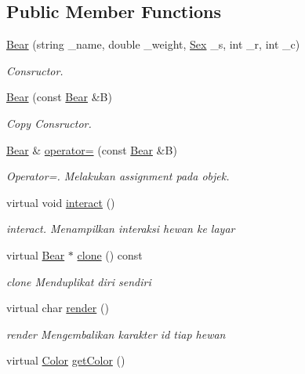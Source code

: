 \subsection*{Public Member Functions}
\begin{DoxyCompactItemize}
\item 
\hyperlink{classBear_a3afafc9aa9b3dd250f6655bf9a0246f6}{Bear} (string \+\_\+name, double \+\_\+weight, \hyperlink{sex_8h_a2633cb393c68bb2ee8080db58fb7ba93}{Sex} \+\_\+s, int \+\_\+r, int \+\_\+c)
\begin{DoxyCompactList}\small\item\em Consructor. \end{DoxyCompactList}\item 
\hyperlink{classBear_a496183e4a4191809bf67634e18c83499}{Bear} (const \hyperlink{classBear}{Bear} \&B)
\begin{DoxyCompactList}\small\item\em Copy Consructor. \end{DoxyCompactList}\item 
\hyperlink{classBear}{Bear} \& \hyperlink{classBear_a6ce0207456c0c4dc02f3dced1b447405}{operator=} (const \hyperlink{classBear}{Bear} \&B)
\begin{DoxyCompactList}\small\item\em Operator=. Melakukan assignment pada objek. \end{DoxyCompactList}\item 
virtual void \hyperlink{classBear_af149829fb71fdedae09885a66964d216}{interact} ()
\begin{DoxyCompactList}\small\item\em interact. Menampilkan interaksi hewan ke layar \end{DoxyCompactList}\item 
virtual \hyperlink{classBear}{Bear} $\ast$ \hyperlink{classBear_a72baa5599585a59e57727f0f00e09e60}{clone} () const 
\begin{DoxyCompactList}\small\item\em clone Menduplikat diri sendiri \end{DoxyCompactList}\item 
virtual char \hyperlink{classBear_a2a5f7a948404e599fd37538386c384d8}{render} ()
\begin{DoxyCompactList}\small\item\em render Mengembalikan karakter id tiap hewan \end{DoxyCompactList}\item 
virtual \hyperlink{color_8h_ab87bacfdad76e61b9412d7124be44c1c}{Color} \hyperlink{classBear_ac9289a4721aa26c2f198555a9670d0d7}{get\+Color} ()

\end{DoxyCompactItemize}
